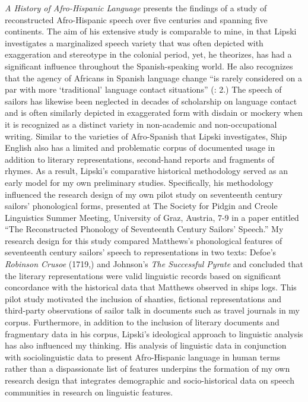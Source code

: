  \textit{A History of Afro-Hispanic Language} presents the findings of a study of reconstructed Afro-Hispanic speech over five centuries and spanning five continents. The aim of his extensive study is comparable to mine, in that Lipski investigates a marginalized speech variety that was often depicted with exaggeration and stereotype in the colonial period, yet, he theorizes, has had a significant influence throughout the Spanish-speaking world. He also recognizes that the agency of Africans in Spanish language change “is rarely considered on a par with more ‘traditional’ language contact situations” (\citealt{Lipski2005}: 2.) The speech of sailors has likewise been neglected in decades of scholarship on language contact and is often similarly depicted in exaggerated form with disdain or mockery when it is recognized as a distinct variety in non-academic and non-occupational writing. Similar to the varieties of Afro-Spanish that Lipski investigates, Ship English also has a limited and problematic corpus of documented usage in addition to literary representations, second-hand reports and fragments of rhymes. As a result, Lipski’s comparative historical methodology served as an early model for my own preliminary studies. Specifically, his methodology influenced the research design of my own pilot study on seventeenth century sailors’ phonological forms, presented at The Society for Pidgin and Creole Linguistics Summer Meeting, University of Graz, Austria, 7-9 \citealt{July2015} in a paper entitled “The Reconstructed Phonology of Seventeenth Century Sailors’ Speech.” My research design for this study compared Matthews’s phonological features of seventeenth century sailors’ speech to representations in two texts: Defoe’s \textit{Robinson Crusoe} (1719,) and Johnson’s \textit{The Successful Pyrate}  and concluded that the literary representations were valid linguistic records based on significant concordance with the historical data that Matthews observed in ships logs. This pilot study motivated the inclusion of shanties, fictional representations and third-party observations of sailor talk in documents such as travel journals in my corpus. Furthermore, in addition to the inclusion of literary documents and fragmentary data in his corpus, Lipski’s ideological approach to linguistic analysis has also influenced my thinking. His analysis of linguistic data in conjunction with sociolinguistic data to present Afro-Hispanic language in human terms rather than a dispassionate list of features underpins the formation of my own research design that integrates demographic and socio-historical data on speech communities in research on linguistic features.

